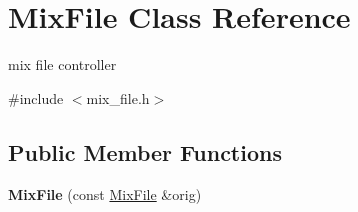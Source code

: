 \hypertarget{class_mix_file}{
\section{MixFile Class Reference}
\label{class_mix_file}
}


mix file controller  




{\ttfamily \#include $<$mix\_\-file.h$>$}

\subsection*{Public Member Functions}
\begin{DoxyCompactItemize}
\item 
\hypertarget{class_mix_file_ac88416ea295349a8c834011520359599}{
{\bfseries MixFile} (const \hyperlink{class_mix_file}{MixFile} \&orig)}
\label{class_mix_file_ac88416ea295349a8c834011520359599}


\end{DoxyCompactItemize}
